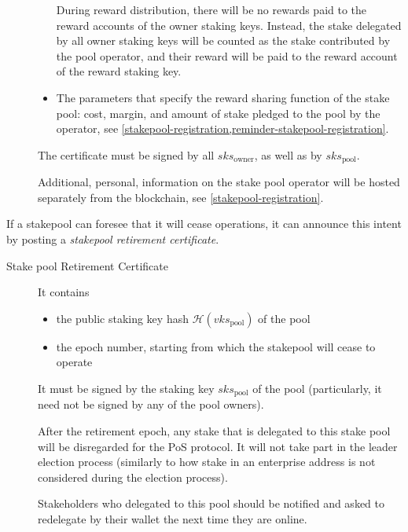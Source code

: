 \documentclass[11pt,a4paper]{article}
\begin{document}
\begin{description}
\begin{itemize}
  During reward distribution, there will be no rewards paid to the reward
  accounts of the owner staking keys. Instead, the stake delegated by all owner
  staking keys will be counted as the stake contributed by the pool operator,
  and their reward will be paid to the reward account of the reward staking key.

\item
  The parameters that specify the reward sharing function of the stake
  pool: cost, margin, and amount of stake pledged to the pool by the
  operator, see \cref{stakepool-registration,reminder-stakepool-registration}.
\end{itemize}

The certificate must be signed by all \(sks_\text{owner}\), as well as
by \(sks_\text{pool}\).

Additional, personal, information on the stake pool operator will be
hosted separately from the blockchain, see \cref{stakepool-registration}.
\end{description}

If a stakepool can foresee that it will cease operations, it can
announce this intent by posting a \emph{stakepool retirement
certificate}.

\begin{description}
\item[Stake pool Retirement Certificate]
It contains

\begin{itemize}
\item
  the public staking key hash \(\mathcal{H}(vks_\text{pool})\) of the
  pool
\item
  the epoch number, starting from which the stakepool will cease to
  operate
\end{itemize}

It must be signed by the staking key \(sks_\text{pool}\) of the pool
(particularly, it need not be signed by any of the pool owners).

After the retirement epoch, any stake that is delegated to this stake
pool will be disregarded for the PoS protocol. It will not take part in
the leader election process (similarly to how stake in an enterprise
address is not considered during the election process).

Stakeholders who delegated to this pool should be notified and asked to
redelegate by their wallet the next time they are online.
\end{description}
\end{document}
